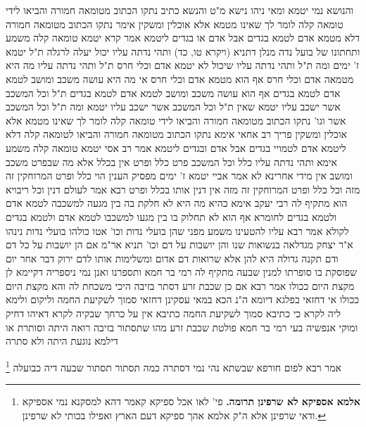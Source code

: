 \documentclass[12pt, openany]{book}
\newcommand{\footnotecomment}[1]{
	\renewcommand\thefootnote{}
	\footnote{#1}}
\newcommand{\commenta}[1]{\footnotecomment{#1}}
\begin{document}
{והנושא נמי יטמא ומאי ניהו נישא מ"ט והנשא כתיב 
נתקו הכתוב מטומאה חמורה והביאו לידי טומאה קלה לומר לך שאינו מטמא אלא אוכלין ומשקין 
אימר נתקו הכתוב מטומאה חמורה דלא מטמא אדם לטמא בגדים אבל אדם או בגדים ליטמא אמר קרא יטמא טומאה קלה משמע 
ותחתונו של בועל נדה מנלן דתניא (ויקרא טו, כד) ותהי נדתה עליו
יכול יעלה לרגלה ת"ל יטמא ז' ימים 
ומה ת"ל ותהי נדתה עליו שיכול לא יטמא אדם וכלי חרס ת"ל ותהי נדתה עליו מה היא מטמאה אדם וכלי חרס אף הוא מטמא אדם וכלי חרס 
אי מה היא עושה משכב ומושב לטמא אדם לטמא בגדים אף הוא עושה משכב ומושב לטמא אדם לטמא בגדים ת"ל וכל המשכב אשר ישכב עליו יטמא 
שאין ת"ל וכל המשכב אשר ישכב עליו יטמא ומה ת"ל וכל המשכב אשר וגו' נתקו הכתוב מטומאה חמורה והביאו לידי טומאה קלה לומר לך שאינו מטמא אלא אוכלין ומשקין 
פריך רב אחאי אימא נתקו הכתוב מטומאה חמורה והביאו לטומאה קלה דלא ליטמא אדם לטמויי בגדים אבל אדם ובגדים ליטמא אמר רב אסי יטמא טומאה קלה משמע 
אימא ותהי נדתה עליו כלל וכל המשכב פרט כלל ופרט אין בכלל אלא מה שבפרט משכב ומושב אין מידי אחרינא לא 
אמר אביי יטמא ז' ימים מפסיק הענין הוי כלל ופרט המרוחקין זה מזה וכל כלל ופרט המרוחקין זה מזה אין דנין אותו בכלל ופרט 
רבא אמר לעולם דנין וכל ריבויא הוא 
מתקיף לה רבי יעקב אימא כהיא מה היא לא חלקת בה בין מגעה למשכבה לטמא אדם ולטמא בגדים לחומרא אף הוא לא תחלוק בו בין מגעו למשכבו לטמא אדם ולטמא בגדים לקולא 
אמר רבא עליו להטעינו משמע
מפני שהן בועלי נדות וכו' אטו כולהו בועלי נדות נינהו א"ר יצחק מגדלאה בנשואות שנו
והן יושבות על דם וכו' תניא אר"מ אם הן יושבות על כל דם ודם תקנה גדולה היא להן
אלא שרואות דם אדום ומשלימות אותו לדם ירוק 
דבר אחר יום שפוסקת בו סופרתו למנין שבעה 
מתקיף לה רמי בר חמא ותספרנו ואנן נמי ניספריה דקיימא לן מקצת היום ככולו 
אמר רבא אם כן שכבת זרע דסתר בזיבה היכי משכחת לה והא מקצת היום ככולו 
אי דחזאי בפלגא דיומא ה"נ הכא במאי עסקינן דחזאי סמוך לשקיעת החמה 
וליקום ולימא ליה לקרא כי כתיבא סמוך לשקיעת החמה כתיבא אין על כרחך שבקיה לקרא דאיהו דחיק ומוקי אנפשיה 
בעי רמי בר חמא פולטת שכבת זרע מהו שתסתור בזיבה רואה היתה וסותרת
או דילמא נוגעת היתה ולא סתרה 
\commenta{\textbf{אלמא אספיקא לא שרפינן תרומה.} פי' לאו אכל ספיקא קאמר דהא למסקנא נמי אספיקא ודאי שרפינן אלא ה"ק אלמא אהך ספיקא דעם הארץ ואפילו בכותי לא שרפינן. }
אמר רבא לפום חורפא שבשתא נהי נמי דסתרה כמה תסתור תסתור שבעה דיה כבועלה 
}
\end{document}
